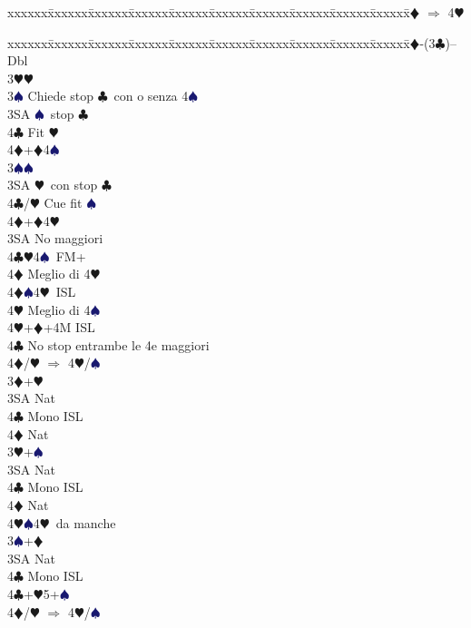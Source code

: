 \documentclass[a4paper,italian]{article}
\newcommand{\BC}{\textcolor{OliveGreen}{$\clubsuit$}}
\newcommand{\BD}{\textcolor{RedOrange}{$\vardiamondsuit$}}
\newcommand{\BH}{\textcolor{Red2}{$\varheartsuit${}}}
\newcommand{\BS}{\textcolor{MidnightBlue}{$\spadesuit${}}}
\newenvironment{bidtable}
{\begin{tabbing}

    xxxxxx\=xxxxxx\=xxxxxx\=xxxxxx\=xxxxxx\=xxxxxx\=xxxxxx\=xxxxxx\=xxxxxx\=xxxxxx\=\kill}
{\end{tabbing} }%
\begin{document}
\begin{multicols}{2}
\begin{bidtable}
        4\BD \> $\Rightarrow$ 4\BH \-
    \end{bidtable}
    \begin{bidtable}
        2\BD-(3\BC)--\+\\
        Dbl\+\\
        3\BH {}\BH \+\\
        3\BS \> Chiede stop \BC\ con o senza 4\BS \\
        3SA \BS\ stop \BC\\
        4\BC \> Fit \BH \\
        4\BD {}+\BD 4\BS \-\\
        3\BS {}\BS \+\\
        3SA \BH\ con stop \BC \\
        4\BC/\BH \> Cue fit \BS \\
        4\BD {}+\BD 4\BH \-\\
        3SA \> No maggiori\+\\
        4\BC {}\BH 4\BS\ FM+\+\\
        4\BD \> Meglio di 4\BH \-\\
        4\BD {}\BS 4\BH\ ISL\+\\
        4\BH \> Meglio di 4\BS \-\\
        4\BH {}+\BD +4M ISL\-\\
        4\BC\> No stop entrambe le 4e maggiori\+\\
        4\BD/\BH\> $\Rightarrow$ 4\BH/\BS\-\\
        3\BD {}+\BH \+\\
        3SA \> Nat\+\\
        4\BC \> Mono ISL\\
        4\BD \> Nat\-\-\\
        3\BH {}+\BS \+\\
        3SA \> Nat\+\\
        4\BC \> Mono ISL\\
        4\BD \> Nat\\
        4\BH {}\BS 4\BH\ da manche\-\-\\
        3\BS {}+\BD \+\\
        3SA \> Nat\+\\
        4\BC \> Mono ISL\-\-\\
        4\BC {}+\BH5+\BS\\
        4\BD/\BH \> $\Rightarrow$ 4\BH /\BS \-
    \end{bidtable}


\end{multicols}
\end{document}
